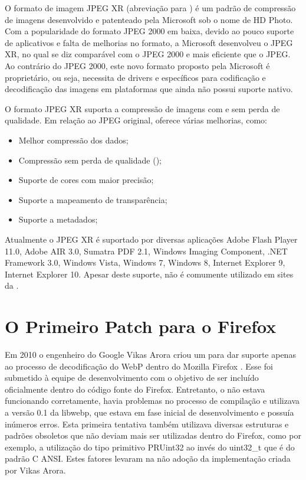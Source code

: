 \documentclass[espaco=simples,appendix=Name]{abnt}
\begin{document}
O formato de imagem JPEG XR (abreviação para ) é um padrão de compressão de imagens desenvolvido e patenteado pela Microsoft sob o nome de HD Photo.
Com a popularidade do formato JPEG 2000 em baixa, devido ao pouco suporte de aplicativos e falta de melhorias no formato, a Microsoft desenvolveu o JPEG XR, no qual se diz comparável com o JPEG 2000 e mais eficiente que o JPEG. Ao contrário do JPEG 2000, este novo formato proposto pela Microsoft é proprietário, ou seja, necessita de drivers e  específicos para codificação e decodificação das imagens em plataformas que ainda não possui suporte nativo.

O formato JPEG XR suporta a compressão de imagens com e sem perda de qualidade. Em relação ao JPEG original, oferece várias melhorias, como:
\begin{itemize}
	\item Melhor compressão dos dados;
	\item Compressão sem perda de qualidade ();
	\item Suporte de cores com maior precisão;
	\item Suporte a  mapeamento de transparência;
	\item Suporte a metadados;
\end{itemize}

Atualmente o JPEG XR é suportado por diversas aplicações Adobe Flash Player 11.0, Adobe AIR 3.0, Sumatra PDF 2.1, Windows Imaging Component, .NET Framework 3.0, Windows Vista, Windows 7, Windows 8, Internet Explorer 9, Internet Explorer 10. Apesar deste suporte, não é comumente utilizado em sites da . \cite{HDPhoto}

\section{O Primeiro Patch para o Firefox}

Em 2010 o engenheiro do Google Vikas Arora criou um  para dar suporte apenas ao processo de decodificação do WebP dentro do Mozilla Firefox \cite{FirefoxBug}. Esse  foi submetido à equipe de desenvolvimento com o objetivo de ser incluído oficialmente dentro do código fonte do Firefox. Entretanto, o  não estava funcionando corretamente, havia problemas no processo de compilação e utilizava a versão 0.1 da libwebp, que estava em fase inicial de desenvolvimento e possuía inúmeros erros. Esta primeira tentativa também utilizava diversas estruturas e padrões obsoletos que não deviam mais ser utilizadas dentro do Firefox, como por exemplo, a utilização do tipo primitivo PRUint32 ao invés do uint32\_t que é do padrão C ANSI. Estes fatores levaram na não adoção da implementação criada por Vikas Arora.
\end{document}
